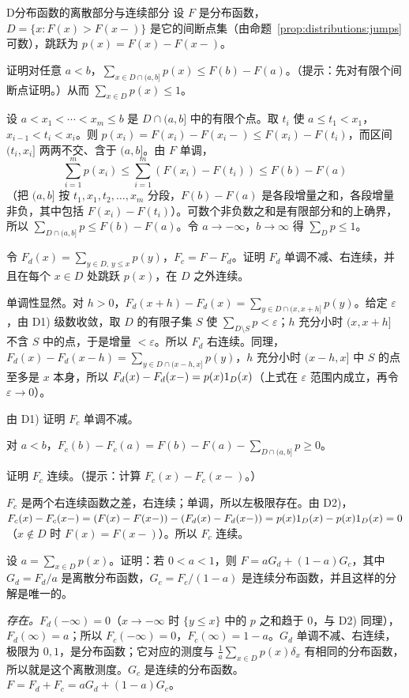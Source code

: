 \begin{probleme}{D}{分布函数的离散部分与连续部分}
设 $F$ 是分布函数，$D=\{x:F(x)>F(x-)\}$ 是它的间断点集（由命题~\ref{prop:distributions:jumps} 可数），跳跃为 $p(x)=F(x)-F(x-)$。
\begin{questions}
\item 证明对任意 $a<b$，$\sum_{x\in D\cap(a,b]}p(x)\leqslant F(b)-F(a)$。（提示：先对有限个间断点证明。）从而 $\sum_{x\in D}p(x)\leqslant1$。
\begin{solution}
设 $a<x_1<\cdots<x_m\leqslant b$ 是 $D\cap(a,b]$ 中的有限个点。取 $t_i$ 使 $a\leqslant t_1<x_1$，$x_{i-1}<t_i<x_i$。则 $p(x_i)=F(x_i)-F(x_i-)\leqslant F(x_i)-F(t_i)$，而区间 $(t_i,x_i]$ 两两不交、含于 $(a,b]$。由 $F$ 单调，
\[
\sum_{i=1}^mp(x_i)\leqslant\sum_{i=1}^m(F(x_i)-F(t_i))\leqslant F(b)-F(a)
\]
（把 $(a,b]$ 按 $t_1,x_1,t_2,\dots,x_m$ 分段，$F(b)-F(a)$ 是各段增量之和，各段增量非负，其中包括 $F(x_i)-F(t_i)$）。可数个非负数之和是有限部分和的上确界，所以 $\sum_{D\cap(a,b]}p\leqslant F(b)-F(a)$。令 $a\to-\infty$，$b\to\infty$ 得 $\sum_Dp\leqslant1$。
\end{solution}
\item 令 $F_d(x)=\sum_{y\in D,\,y\leqslant x}p(y)$，$F_c=F-F_d$。证明 $F_d$ 单调不减、右连续，并且在每个 $x\in D$ 处跳跃 $p(x)$，在 $D$ 之外连续。
\begin{solution}
单调性显然。对 $h>0$，$F_d(x+h)-F_d(x)=\sum_{y\in D\cap(x,x+h]}p(y)$。给定 $\varepsilon$，由 D1) 级数收敛，取 $D$ 的有限子集 $S$ 使 $\sum_{D\setminus S}p<\varepsilon$；$h$ 充分小时 $(x,x+h]$ 不含 $S$ 中的点，于是增量 $<\varepsilon$。所以 $F_d$ 右连续。同理，$F_d(x)-F_d(x-h)=\sum_{y\in D\cap(x-h,x]}p(y)$，$h$ 充分小时 $(x-h,x]$ 中 $S$ 的点至多是 $x$ 本身，所以 $F_d(x)-F_d(x-)=p(x)1_D(x)$（上式在 $\varepsilon$ 范围内成立，再令 $\varepsilon\to0$）。
\end{solution}
\item 由 D1) 证明 $F_c$ 单调不减。
\begin{solution}
对 $a<b$，$F_c(b)-F_c(a)=F(b)-F(a)-\sum_{D\cap(a,b]}p\geqslant0$。
\end{solution}
\item 证明 $F_c$ 连续。（提示：计算 $F_c(x)-F_c(x-)$。）
\begin{solution}
$F_c$ 是两个右连续函数之差，右连续；单调，所以左极限存在。由 D2)，$F_c(x)-F_c(x-)=(F(x)-F(x-))-(F_d(x)-F_d(x-))=p(x)1_D(x)-p(x)1_D(x)=0$（$x\notin D$ 时 $F(x)=F(x-)$）。所以 $F_c$ 连续。
\end{solution}
\item 设 $a=\sum_{x\in D}p(x)$。证明：若 $0<a<1$，则 $F=aG_d+(1-a)G_c$，其中 $G_d=F_d/a$ 是离散分布函数，$G_c=F_c/(1-a)$ 是连续分布函数，并且这样的分解是唯一的。
\begin{solution}
\emph{存在。}$F_d(-\infty)=0$（$x\to-\infty$ 时 $\{y\leqslant x\}$ 中的 $p$ 之和趋于 $0$，与 D2) 同理），$F_d(\infty)=a$；所以 $F_c(-\infty)=0$，$F_c(\infty)=1-a$。$G_d$ 单调不减、右连续，极限为 $0,1$，是分布函数；它对应的测度与 $\frac1a\sum_{x\in D}p(x)\delta_x$ 有相同的分布函数，所以就是这个离散测度。$G_c$ 是连续的分布函数。$F=F_d+F_c=aG_d+(1-a)G_c$。


\end{solution}
\end{questions}
\end{probleme}
